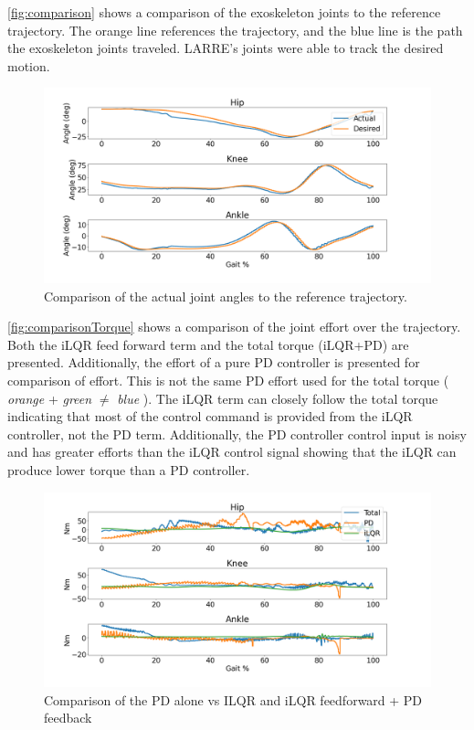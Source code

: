 \autoref{fig:comparison} shows a comparison of the exoskeleton joints to the reference trajectory. The orange line references the trajectory, and the blue line is the path the exoskeleton joints traveled. LARRE's joints were able to track the desired motion. 


\begin{figure}[h!]
    \centering
    \includegraphics[scale=0.27]{images/controllers/compare_traj.png}
    \caption[iLQR controller trajectory]{Comparison of the actual joint angles to the reference trajectory.}
    \label{fig:comparison}
\end{figure}


\autoref{fig:comparisonTorque} shows a comparison of the joint effort over the trajectory. Both the iLQR feed forward term and the total torque (iLQR+PD) are presented. Additionally, the effort of a pure PD controller is presented for comparison of effort. This is not the same PD effort used for the total torque ( \textit{orange} +  \textit{green} $\neq$  \textit{blue} ). The iLQR term can closely follow the total torque indicating that most of the control command is provided from the iLQR controller, not the PD term. Additionally, the PD controller control input is noisy and has greater efforts than the iLQR control signal showing that the iLQR can produce lower torque than a PD controller. 

\begin{figure}[h!]
    \centering
    \includegraphics[scale=0.35]{images/controllers/torque_compare.png}
    \caption[Torque Comparison of the iLQR controller]{Comparison of the PD alone vs ILQR and iLQR feedforward + PD feedback}
    \label{fig:comparisonTorque}
\end{figure}
